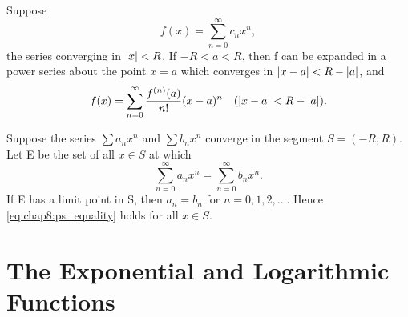 \begin{theorem} %
  \label{thm:chap8:ps_taylor}
  Suppose
  \[ f(x) = \sum_{n=0}^\infty c_n x^n, \]
  the series converging in $\left\lvert x \right\rvert < R$. If $-R < a < R$, then f can
  be expanded in a power series about the point $x=a$ which converges
  in $\left\lvert x-a \right\rvert < R - \left\lvert a \right\rvert$, and
  \begin{equation} \label{eq:chap8:taylor_expansion}
    f(x) = \sum_{n=0}^\infty \frac{f^{(n)}(a)}{n!} (x-a)^n \quad
    (\left\lvert x-a \right\rvert < R - \left\lvert a \right\rvert).
  \end{equation}
\end{theorem}

\begin{theorem} %
  \label{thm:chap8:ps_uniqueness}
  Suppose the series $\sum a_n x^n$ and $\sum b_n x^n$ converge in
  the segment $S = (-R, R)$. Let E be the set of all $x \in S$ at which
  \begin{equation} \label{eq:chap8:ps_equality}
    \sum_{n=0}^\infty a_n x^n = \sum_{n=0}^\infty b_n x^n.
  \end{equation}
  If E has a limit point in S, then $a_n = b_n$ for $n=0, 1, 2,
  \dots$. Hence \eqref{eq:chap8:ps_equality} holds for all $x \in S$.
\end{theorem}



\section{The Exponential and Logarithmic Functions}
\label{sec:chap8:exp_log}


